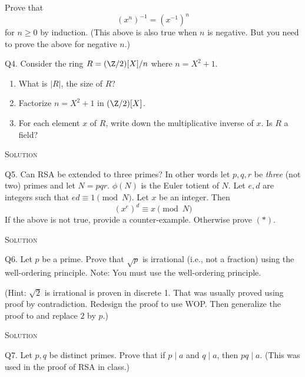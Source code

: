 Prove that
\[
(x^n)^{-1} = (x^{-1})^n
\]
for $n \geq 0$ by induction.
(This above is also true when $n$ is negative. But you need to prove
the above for negative $n$.)


\newpage
Q4. Consider the ring $R = (\Z/2)[X]/n$ where $n = X^2 + 1$.
\begin{enumerate}[nosep]

 \item
 What is $|R|$, the size of $R$?

 \item
 Factorize $n = X^2 + 1$ in $(\Z/2)[X]$.

 \item
 For each element $x$ of $R$, write down the multiplicative inverse of $x$.
 Is $R$ a field?
 
\end{enumerate}

\textsc{Solution}



\newpage
Q5.
Can RSA be extended to three primes?
In other words let $p,q,r$ be \textit{three} (not two) primes and let $N = pqr$.
$\phi(N)$ is the Euler totient of $N$.
Let $e,d$ are integers such that $ed \equiv 1 \pmod{N}$.
Let $x$ be an integer.
Then
\[
\left( x^e \right)^d \equiv x \pmod{N} \tag{*}
\]
If the above is not true, provide a counter-example.
Otherwise prove $(*)$.

\textsc{Solution}




\newpage
Q6.
Let $p$ be a prime.
Prove that $\sqrt{p}$ is irrational (i.e., not a fraction) using
the well-ordering principle.
Note: You must use the well-ordering principle.

(Hint: $\sqrt{2}$ is irrational is proven in discrete 1.
That was usually proved using proof by contradiction.
Redesign the proof to use WOP.
Then generalize the proof to and replace $2$ by $p$.)

\textsc{Solution}




\newpage
Q7.
Let $p, q$ be distinct primes.
Prove that if $p \mid a$ and $q \mid a$, then $pq \mid a$.
(This was used in the proof of RSA in class.)

